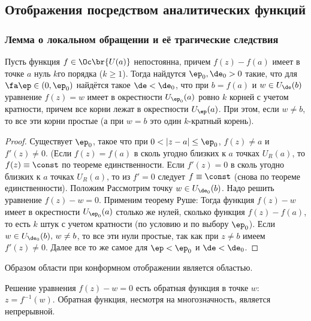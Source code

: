 \documentclass[a4paper]{article}
\begin{document}
\begin{theorem}
\subsection{Отображения посредством аналитических функций}

\subsubsection{Лемма о локальном обращении и её трагические следствия}

\begin{lemma}
Пусть функция $f\in \Oc\br{U(a)}$ непостоянна, причем $f(z)-f(a)$ имеет в точке $a$ нуль $k$\д го порядка ($k \ge 1$).
Тогда найдутся $\ep_0, \de_0>0$ такие, что для $\fa \ep \in (0,\ep_0)$
найдётся такое $\de <\de_0$, что при $b = f(a)$ и $w \in U_\de(b)$  уравнение $f(z) = w$  имеет в окрестности $U_{\ep_0}(a)$  ровно $k$ корней с учетом кратности,
причем все корни лежат в окрестности $U_\ep(a)$. При этом, если $w\neq b$, то все эти корни простые
(а при $w=b$ это один $k$-кратный корень).
\end{lemma}
\begin{proof}
Существует $\ep_0$, такое что при $0<|z-a|\le\ep_0$, $f(z)\not=a$ и $f'(z)\not =0$.
(Если $f(z)=f(a)$  в сколь угодно близких к $a$  точках $U_R(a)$, то $f(z)\equiv \const$ по теореме единственности. Если $f'(z) = 0$  в сколь угодно близких к $a$ точках
$U_R(a)$, то из $f'=0$  следует $f\equiv \const$ (снова по теореме единственности).
Положим
Рассмотрим точку $w \in U_{\de_0}(b)$. Надо решить уравнение $f(z)-w=0$. Применим теорему Руше:
Тогда функция $f(z)-w$  имеет в окрестности $U_{\ep_0}(a)$ столько же нулей,   сколько функция $f(z)-f(a)$,
то есть $k$ штук с учетом кратности (по условию и по выбору $\ep_0$).
Если $w\in U_{\de_0}(b),\, w\neq b$, то все эти нули простые, так как при $z\neq b$ имеем $f'(z) \neq 0$.
Далее все то же самое для $\ep<\ep_0$ и $\de<\de_0$.
\end{proof}

\begin{imp}
Образом области при конформном отображении является областью.
\end{imp}

Решение уравнения $f(z)-w=0$ есть обратная функция в точке $w$: $z=f^{-1}(w)$.
Обратная функция,  несмотря на многозначность,  является непрерывной.


\end{theorem}
\end{document}

